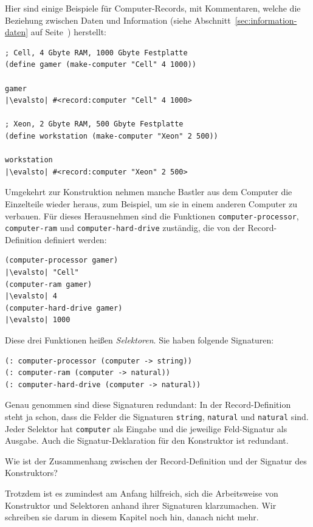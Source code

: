 Hier sind einige Beispiele für Computer-Records, mit Kommentaren,
welche die Beziehung zwischen Daten und Information (siehe
Abschnitt~\ref{sec:information-daten} auf
Seite~\pageref{sec:information-daten}) herstellt:
%
\begin{lstlisting}
; Cell, 4 Gbyte RAM, 1000 Gbyte Festplatte
(define gamer (make-computer "Cell" 4 1000))

gamer
|\evalsto| #<record:computer "Cell" 4 1000>

; Xeon, 2 Gbyte RAM, 500 Gbyte Festplatte
(define workstation (make-computer "Xeon" 2 500))

workstation
|\evalsto| #<record:computer "Xeon" 2 500>
\end{lstlisting}
%
Umgekehrt zur Konstruktion nehmen manche Bastler aus dem Computer die
Einzelteile wieder heraus, zum Beispiel, um sie in einem anderen
Computer zu verbauen. Für dieses Herausnehmen sind die Funktionen
\lstinline{computer-processor}, \lstinline{computer-ram} und
\lstinline{computer-hard-drive} zuständig, die von der
Record-Definition definiert werden:
%
\begin{lstlisting}
(computer-processor gamer)
|\evalsto| "Cell"
(computer-ram gamer)
|\evalsto| 4
(computer-hard-drive gamer)
|\evalsto| 1000
\end{lstlisting}
%
Diese drei Funktionen heißen \textit{Selektoren}.  Sie haben
folgende Signaturen:
%
\begin{lstlisting}
(: computer-processor (computer -> string))
(: computer-ram (computer -> natural))
(: computer-hard-drive (computer -> natural))
\end{lstlisting}
%
Genau genommen sind diese Signaturen redundant: In der
Record-Definition steht ja schon, dass die Felder die Signaturen
\lstinline{string}, \lstinline{natural} und \lstinline{natural} sind.  Jeder
Selektor hat \lstinline{computer} als Eingabe und die jeweilige
Feld-Signatur als Ausgabe.  Auch die Signatur-Deklaration für den
Konstruktor ist redundant.
%
\begin{aufgabeinline}
  Wie ist der Zusammenhang zwischen der Record-Definition und der
  Signatur des Konstruktors?
\end{aufgabeinline}
%
Trotzdem ist es zumindest am Anfang hilfreich, sich die Arbeitsweise
von Konstruktor und Selektoren anhand ihrer Signaturen klarzumachen.
Wir schreiben sie darum in diesem Kapitel noch hin, danach nicht mehr.

